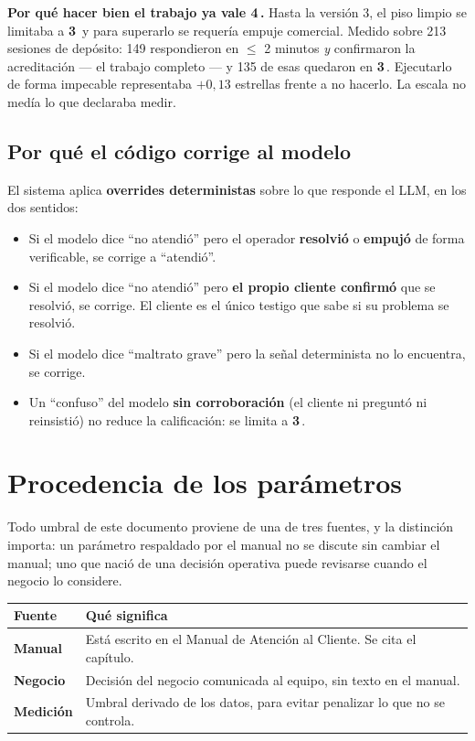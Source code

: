 \documentclass[11pt,a4paper]{article}
\newcommand{\est}[1]{\textbf{#1}\,\raisebox{0.5pt}{$\star$}}
\begin{document}
\begin{nota}
\textbf{Por qué hacer bien el trabajo ya vale \est{4}.} Hasta la versión 3, el piso
limpio se limitaba a \est{3} y para superarlo se requería empuje comercial. Medido
sobre 213 sesiones de depósito: 149 respondieron en $\le$ 2 minutos \emph{y}
confirmaron la acreditación --- el trabajo completo --- y 135 de esas quedaron en
\est{3}. Ejecutarlo de forma impecable representaba $+0{,}13$ estrellas frente a no
hacerlo. La
escala no medía lo que declaraba medir.
\end{nota}

\subsection{Por qué el código corrige al modelo}

El sistema aplica \textbf{overrides deterministas} sobre lo que responde el LLM,
en los dos sentidos:

\begin{itemize}
\item Si el modelo dice ``no atendió'' pero el operador \textbf{resolvió} o
\textbf{empujó} de forma verificable, se corrige a ``atendió''.
\item Si el modelo dice ``no atendió'' pero \textbf{el propio cliente confirmó} que
se resolvió, se corrige. El cliente es el único testigo que sabe si su problema se
resolvió.
\item Si el modelo dice ``maltrato grave'' pero la señal determinista no lo
encuentra, se corrige.
\item Un ``confuso'' del modelo \textbf{sin corroboración} (el cliente ni preguntó ni
reinsistió) no reduce la calificación: se limita a \est{3}.
\end{itemize}

\newpage
\section{Procedencia de los parámetros}
\label{sec:procedencia}

Todo umbral de este documento proviene de una de tres fuentes, y la distinción importa:
un parámetro respaldado por el manual no se discute sin cambiar el manual; uno que nació de
una decisión operativa puede revisarse cuando el negocio lo considere.

\begin{center}
\begin{tabularx}{\textwidth}{@{}lX@{}}
\toprule
\textbf{Fuente} & \textbf{Qué significa} \\
\midrule
\textbf{Manual} & Está escrito en el Manual de Atención al Cliente. Se cita el capítulo. \\
\textbf{Negocio} & Decisión del negocio comunicada al equipo, sin texto en el manual. \\
\textbf{Medición} & Umbral derivado de los datos, para evitar penalizar lo que no se controla. \\
\bottomrule
\end{tabularx}
\end{center}
\end{document}
